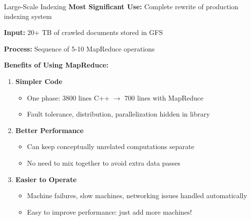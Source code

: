\documentclass[aspectratio=169]{beamer}
\begin{document}
\begin{frame}{Large-Scale Indexing}
\textbf{Most Significant Use:} Complete rewrite of production indexing system

\vspace{0.3cm}

\textbf{Input:} 20+ TB of crawled documents stored in GFS

\vspace{0.3cm}

\textbf{Process:} Sequence of 5-10 MapReduce operations

\vspace{0.3cm}

\textbf{Benefits of Using MapReduce:}

\begin{enumerate}
    \item \textbf{Simpler Code}
    \begin{itemize}
        \item One phase: 3800 lines C++ $\rightarrow$ 700 lines with MapReduce
        \item Fault tolerance, distribution, parallelization hidden in library
    \end{itemize}

    \item \textbf{Better Performance}
    \begin{itemize}
        \item Can keep conceptually unrelated computations separate
        \item No need to mix together to avoid extra data passes
    \end{itemize}

    \item \textbf{Easier to Operate}
    \begin{itemize}
        \item Machine failures, slow machines, networking issues handled automatically
        \item Easy to improve performance: just add more machines!
    \end{itemize}
\end{enumerate}
\end{frame}
\end{document}
